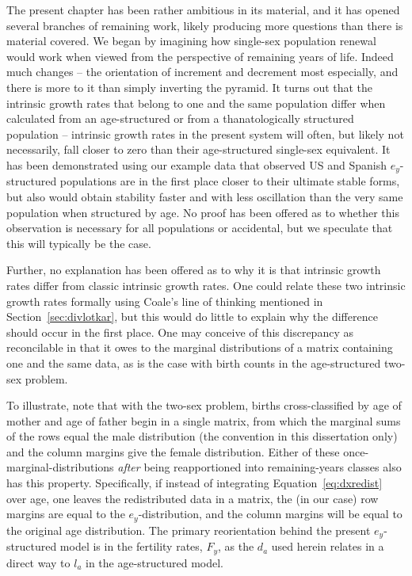 \FloatBarrier

The present chapter has been rather ambitious in its material, and it has opened
several branches of remaining work, likely producing more questions
than there is material covered. We began by imagining how single-sex population
renewal would work when viewed from the perspective of remaining years of life. 
Indeed much changes -- the orientation of increment and decrement most
especially, and there is more to it than simply inverting the pyramid. It turns
out that the intrinsic growth rates that belong to one and the same population 
differ when calculated from an age-structured or from a thanatologically 
structured population -- intrinsic growth rates in the present
system will often, but likely not necessarily, fall closer to zero than their
age-structured single-sex equivalent. It has been demonstrated using our 
example data that observed US and Spanish $e_y$-structured populations
are in the first place closer to their ultimate stable forms, but also would 
obtain stability faster and with less oscillation
than the very same population when structured by age. No proof has been offered
as to whether this observation is necessary for all populations or accidental,
but we speculate that this will typically be the case. 

Further, no explanation
has been offered as to why it is that intrinsic growth rates differ from classic 
intrinsic growth rates. One could relate these two intrinsic growth
rates formally using Coale's line of thinking mentioned in
Section~\ref{sec:divlotkar}, but this would do little to explain why the
difference should occur in the first place. One may conceive of this
discrepancy as reconcilable in that it owes to the marginal distributions
of a matrix containing one and the same data, as is the case with birth counts
in the age-structured two-sex problem. 

To illustrate, note that with the two-sex
problem, births cross-classified by age of mother and age of father begin 
in a single matrix, from which the marginal
sums of the rows equal the male distribution (the convention in this
dissertation only) and the column margins give the female distribution. Either
of these once-marginal-distributions \textit{after} being reapportioned into
remaining-years classes also has this property. Specifically, if instead of
integrating Equation~\eqref{eq:dxredist} over age, one leaves the redistributed
data in a matrix, the (in our case) row margins are equal to the
$e_y$-distribution, and the column margins will be equal to the original age
distribution. The primary reorientation behind the present
$e_y$-structured model is in the fertility rates, $F_y$, as the $d_a$ used
herein relates in a direct way to $l_a$ in the age-structured model. 

